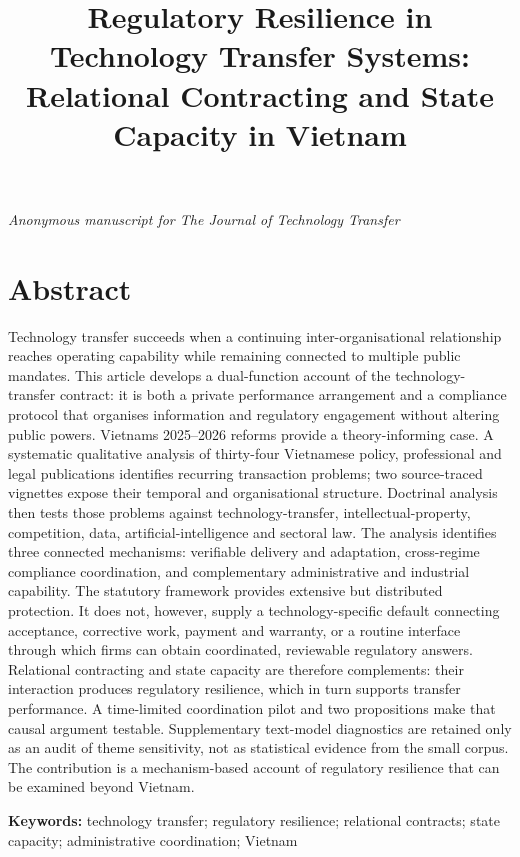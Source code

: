\documentclass[
]{article}
\title{Regulatory Resilience in Technology Transfer Systems: Relational
Contracting and State Capacity in Vietnam}
\author{}
\date{}
\begin{document}
\maketitle

\emph{Anonymous manuscript for The Journal of Technology Transfer}

\section{Abstract}\label{abstract}

Technology transfer succeeds when a continuing inter-organisational
relationship reaches operating capability while remaining connected to
multiple public mandates. This article develops a dual-function account
of the technology-transfer contract: it is both a private performance
arrangement and a compliance protocol that organises information and
regulatory engagement without altering public powers.
Vietnam\textquotesingle s 2025--2026 reforms provide a theory-informing
case. A systematic qualitative analysis of thirty-four Vietnamese
policy, professional and legal publications identifies recurring
transaction problems; two source-traced vignettes expose their temporal
and organisational structure. Doctrinal analysis then tests those
problems against technology-transfer, intellectual-property,
competition, data, artificial-intelligence and sectoral law. The
analysis identifies three connected mechanisms: verifiable delivery and
adaptation, cross-regime compliance coordination, and complementary
administrative and industrial capability. The statutory framework
provides extensive but distributed protection. It does not, however,
supply a technology-specific default connecting acceptance, corrective
work, payment and warranty, or a routine interface through which firms
can obtain coordinated, reviewable regulatory answers. Relational
contracting and state capacity are therefore complements: their
interaction produces regulatory resilience, which in turn supports
transfer performance. A time-limited coordination pilot and two
propositions make that causal argument testable. Supplementary
text-model diagnostics are retained only as an audit of theme
sensitivity, not as statistical evidence from the small corpus. The
contribution is a mechanism-based account of regulatory resilience that
can be examined beyond Vietnam.

\textbf{Keywords:} technology transfer; regulatory resilience;
relational contracts; state capacity; administrative coordination;
Vietnam
\end{document}
